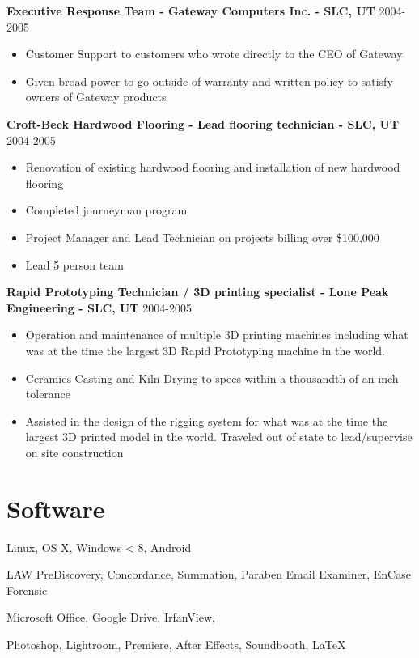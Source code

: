 \documentclass[line,margin]{res}
\begin{document}
\begin{resume}
{\bf Executive Response Team - Gateway Computers Inc. - SLC, UT} \hfill 2004-2005\\
  \begin{itemize} \itemsep -2pt
  \item Customer Support to customers who wrote directly to the CEO of Gateway
  \item Given broad power to go outside of warranty and written policy to satisfy owners of Gateway products
  \end{itemize} 	
{\bf Croft-Beck Hardwood Flooring - Lead flooring technician - SLC, UT} \hfill 2004-2005\\
  \begin{itemize} \itemsep -2pt
  \item Renovation of existing hardwood flooring and installation of new hardwood flooring
  \item Completed journeyman program
  \item Project Manager and Lead Technician on projects billing over \$100,000
  \item Lead 5 person team
  \end{itemize} 	
 {\bf Rapid Prototyping Technician / 3D printing specialist - Lone Peak Engineering - SLC, UT} \hfill 2004-2005\\
  \begin{itemize} \itemsep -2pt
  \item Operation and maintenance of multiple 3D printing machines including what was at the time the largest 3D Rapid Prototyping machine in the world. 
  \item Ceramics Casting and Kiln Drying to specs within a thousandth of an inch tolerance 
  \item Assisted in the design of the rigging system for what was at the time the largest 3D printed model in the world. Traveled out of state to lead/supervise on site construction
  \end{itemize} 	
\section{Software}
 \begin{description} \itemsep -2pt
 \item[Operating Systems:] Linux, OS X, Windows < 8, Android
 \item[EDD Specfic:] LAW PreDiscovery, Concordance, Summation, Paraben Email Examiner, EnCase Forensic
 \item[General:] Microsoft Office, Google Drive, IrfanView, 
 \item[Design:] Photoshop, Lightroom, Premiere, After Effects, Soundbooth, \LaTeX
 \end{description}

\end{resume}
\end{document}
